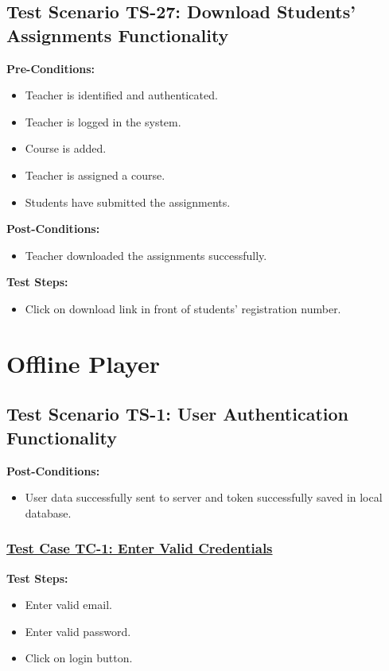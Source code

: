 \subsection{Test Scenario TS-27: Download Students' Assignments Functionality}
\textbf{Pre-Conditions: }
\begin{itemize}

\item Teacher is identified and authenticated.
\item Teacher is logged in the system.
\item Course is added.
\item Teacher is assigned a course.
\item Students have submitted the assignments.

\end{itemize}

\textbf{Post-Conditions: }
\begin{itemize}
\item Teacher downloaded the assignments successfully.

\end{itemize}
\textbf{Test Steps:}
\begin{itemize}

\item Click on download link in front of students' registration number.

\end{itemize}

\section{Offline Player}
\subsection{Test Scenario TS-1: User Authentication Functionality}

\textbf{Post-Conditions: }
\begin{itemize}
\item User data successfully sent to server and token successfully saved in local database.
\end{itemize}
\subsubsection{\underline{Test Case TC-1: Enter Valid Credentials}}
\textbf{Test Steps:}
\begin{itemize}

\item Enter valid email.
\item Enter valid password.
\item Click on login button.

\end{itemize}


